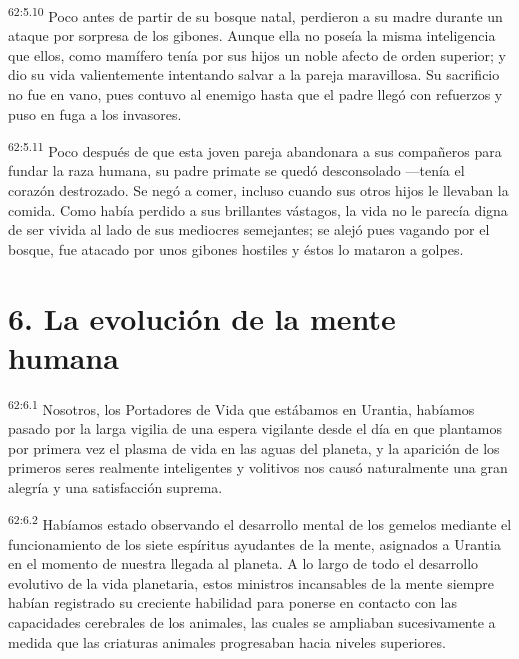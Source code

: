 \par
\textsuperscript{62:5.10} Poco antes de partir de su bosque natal, perdieron a su madre durante un ataque por sorpresa de los gibones. Aunque ella no poseía la misma inteligencia que ellos, como mamífero tenía por sus hijos un noble afecto de orden superior; y dio su vida valientemente intentando salvar a la pareja maravillosa. Su sacrificio no fue en vano, pues contuvo al enemigo hasta que el padre llegó con refuerzos y puso en fuga a los invasores.

\par
\textsuperscript{62:5.11} Poco después de que esta joven pareja abandonara a sus compañeros para fundar la raza humana, su padre primate se quedó desconsolado ---tenía el corazón destrozado. Se negó a comer, incluso cuando sus otros hijos le llevaban la comida. Como había perdido a sus brillantes vástagos, la vida no le parecía digna de ser vivida al lado de sus mediocres semejantes; se alejó pues vagando por el bosque, fue atacado por unos gibones hostiles y éstos lo mataron a golpes.

\section*{6. La evolución de la mente humana}
\par
\textsuperscript{62:6.1} Nosotros, los Portadores de Vida que estábamos en Urantia, habíamos pasado por la larga vigilia de una espera vigilante desde el día en que plantamos por primera vez el plasma de vida en las aguas del planeta, y la aparición de los primeros seres realmente inteligentes y volitivos nos causó naturalmente una gran alegría y una satisfacción suprema.

\par
\textsuperscript{62:6.2} Habíamos estado observando el desarrollo mental de los gemelos mediante el funcionamiento de los siete espíritus ayudantes de la mente, asignados a Urantia en el momento de nuestra llegada al planeta. A lo largo de todo el desarrollo evolutivo de la vida planetaria, estos ministros incansables de la mente siempre habían registrado su creciente habilidad para ponerse en contacto con las capacidades cerebrales de los animales, las cuales se ampliaban sucesivamente a medida que las criaturas animales progresaban hacia niveles superiores.

